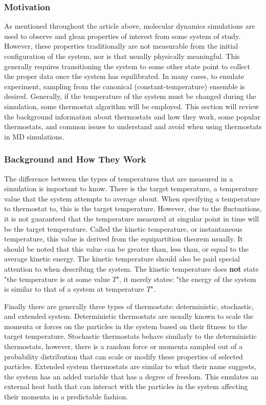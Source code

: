 \documentclass[9pt,bestpractices]{livecoms}
\begin{document}
\subsubsection{Motivation}
As mentioned throughout the article above, molecular dynamics simulations
are used to observe and glean properties of interest from some system of
study.
However, these properties traditionally are not measurable from the
initial configuration of the system, nor is that usually physically meaningful.
This generally requires transitioning the system to some other state point to
collect the proper data once the system has equilibrated.
In many cases, to emulate experiment, sampling from
the canonical (constant-temperature) ensemble is 
desired\cite{thermostatAlgorithms2005}.
Generally, if the temperature of the system must be changed during the
simulation, some thermostat algorithm will be employed.
This section will review the background information about
thermostats and how they work, some popular thermostats, and
common issues to understand and avoid when using thermostats
in MD simulations.

\subsubsection{Background and How They Work}
The difference between the types of temperatures that are measured in
a simulation is important to know.
There is the target temperature, a temperature value that the system
attempts to average about.
When specifying a temperature to thermostat
to, this is the target temperature.
However, due to the fluctuations, it is not
guaranteed that the temperature measured at singular point in time will be the 
target temperature.
Called the kinetic temperature, or instantaneous temperature, this value is
derived from the equipartition theorem usually.
It should be noted that this value can be greater than, less than, or equal
to the average kinetic energy. The kinetic temperature should also be
paid special attention to when describing the system.
The kinetic temperature does \textbf{not} state "the temperature is at
some value $T$", it merely states: "the energy of the system is similar to that
of a system at temperature $T$".

Finally there are generally three types of thermostats: deterministic,
stochastic, and extended system.
Deterministic thermostats are usually known to scale the momenta or forces 
on the particles in the system based on their fitness to the target temperature.
Stochastic thermostats behave similarly to the deterministic thermostats,
however, there is a random force or momenta sampled out of a probability 
distribution that can scale or modify these properties of selected particles.
Extended system thermostats are similar to what their name suggests,
the system has an added variable that has a degree of freedom.
This emulates an external heat bath that can interact with the particles in the
system affecting their momenta in a predictable fashion.
\end{document}
